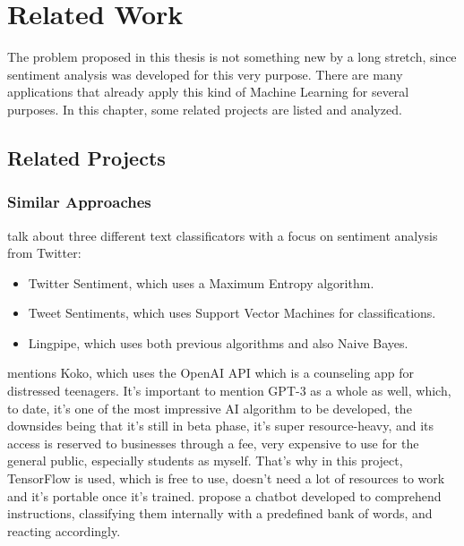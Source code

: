 \chapter{Related Work}
The problem proposed in this thesis is not something new by a long stretch, since sentiment analysis was developed for this very purpose. There are many applications that already apply this kind of Machine Learning for several purposes. In this chapter, some related projects are listed and analyzed.

\section{Related Projects}
\subsection{Similar Approaches}
\citet{rf10} talk about three different text classificators with a focus on sentiment analysis from Twitter: 
\begin{itemize}
\item Twitter Sentiment, which uses a Maximum Entropy algorithm.
\item Tweet Sentiments, which uses Support Vector Machines for classifications.
\item Lingpipe, which uses both previous algorithms and also Naive Bayes.
\end{itemize}
\citet{rf6} mentions Koko, which uses the OpenAI API which is a counseling app for distressed teenagers. It's important to mention GPT-3 as a whole as well, which, to date, it's one of the most impressive AI algorithm to be developed, the downsides being that it's still in beta phase, it's super resource-heavy, and its access is reserved to businesses through a fee, very expensive to use for the general public, especially students as myself. That's why in this project, TensorFlow is used, which is free to use, doesn't need a lot of resources to work and it's portable once it's trained.
\citet{rf14} propose a chatbot developed to comprehend instructions, classifying them internally with a predefined bank of words, and reacting accordingly.

